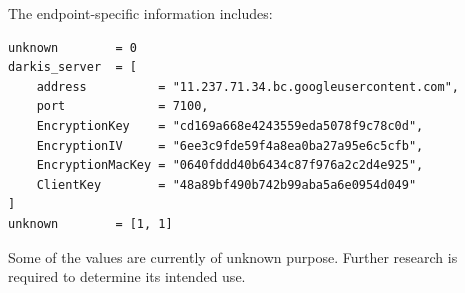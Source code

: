 The endpoint-specific information includes:

\begin{lstlisting}
unknown        = 0
darkis_server  = [
    address          = "11.237.71.34.bc.googleusercontent.com",
    port             = 7100,
    EncryptionKey    = "cd169a668e4243559eda5078f9c78c0d",
    EncryptionIV     = "6ee3c9fde59f4a8ea0ba27a95e6c5cfb",
    EncryptionMacKey = "0640fddd40b6434c87f976a2c2d4e925",
    ClientKey        = "48a89bf490b742b99aba5a6e0954d049"
]
unknown        = [1, 1]
\end{lstlisting}

\begin{tcolorbox}[colback=yellow!10,colframe=orange!80!black,title=Warning]
Some of the values are currently of unknown purpose.
Further research is required to determine its intended use.
\end{tcolorbox}

\newpage